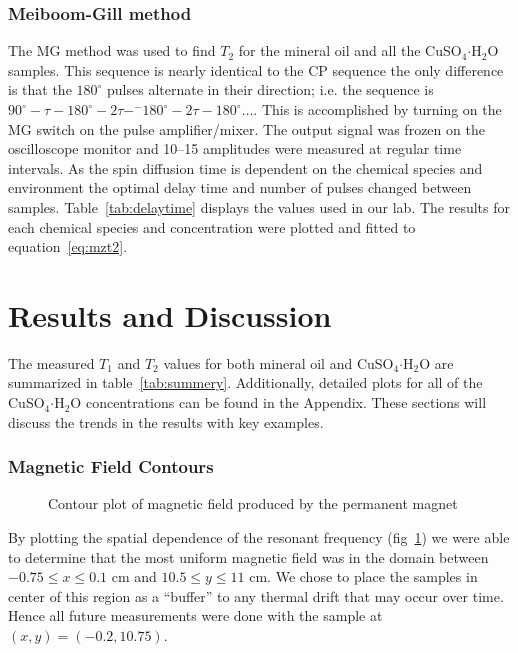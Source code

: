 \documentclass[
reprint,
amsmath,amssymb,
aps,
tikz,
border=5pt
]{revtex4-1}
\newcommand*{\cuso}[1][]{CuSO$_{4} \boldsymbol{\cdot} $H$_2$O }
\begin{document}
\subsubsection*{Meiboom-Gill method}

    The MG method was used to find $T_2$ for the mineral oil and all the \cuso samples. This sequence is nearly identical to the CP sequence the only difference is that the $180^\circ$ pulses alternate in their direction; i.e. the sequence is $90^{\circ}- \tau  - 180^{\circ}-2\tau- ^{-}180^{\circ}-2\tau- 180^{\circ}\dots$. This is accomplished by turning on the MG switch on the pulse amplifier/mixer. The output signal was frozen on the oscilloscope monitor and 10--15 amplitudes were measured at regular time intervals. As the spin diffusion time is dependent on the chemical species and environment the optimal delay time and number of pulses changed between samples. Table~\ref{tab:delaytime} displays the values used in our lab. The results for each chemical species and concentration were plotted and fitted to equation~\ref{eq:mzt2}.


\section*{Results \lowercase{and} Discussion }

    The measured $T_1$ and $T_2$ values for both mineral oil and \cuso are summarized in table~\ref{tab:summery}. Additionally, detailed plots for all of the \cuso concentrations can be found in the Appendix. These sections will discuss the trends in the results with key examples.
  
\subsubsection*{Magnetic Field Contours}

  \begin{figure}[h]
    \resizebox{0.45\textwidth}{!}{}
    \caption{Contour plot of magnetic field produced by the permanent magnet}
    \label{fig:magContour}
  \end{figure}

  By plotting the spatial dependence of the resonant frequency (fig~\ref{fig:magContour}) we were able to determine that the most uniform magnetic field was in the domain between $-0.75 \leq x \leq 0.1 $ cm and $10.5 \leq y \leq 11 $ cm. We chose to place the samples in center of this region as a ``buffer'' to any thermal drift that may occur over time. Hence all future measurements were done with the sample at $ (x,y) = (-0.2, 10.75)$. 
\end{document}
